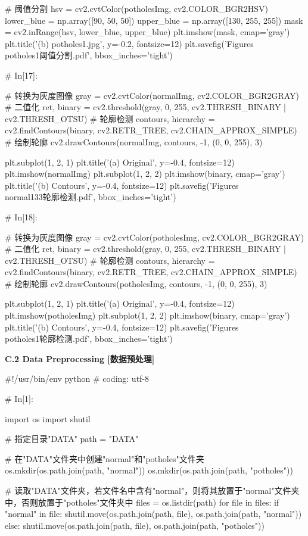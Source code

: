 \documentclass{MathorCupmodeling}
\begin{document}
\begin{python}
# 阈值分割
hsv = cv2.cvtColor(potholesImg, cv2.COLOR_BGR2HSV)
lower_blue = np.array([90, 50, 50])
upper_blue = np.array([130, 255, 255])
mask = cv2.inRange(hsv, lower_blue, upper_blue)
plt.imshow(mask, cmap='gray')
plt.title('(b) potholes1.jpg', y=-0.2, fontsize=12)
plt.savefig('Figures\\potholes1阈值分割.pdf', bbox_inches='tight')

# In[17]:


# 转换为灰度图像
gray = cv2.cvtColor(normalImg, cv2.COLOR_BGR2GRAY)
# 二值化
ret, binary = cv2.threshold(gray, 0, 255, cv2.THRESH_BINARY | cv2.THRESH_OTSU)
# 轮廓检测
contours, hierarchy = cv2.findContours(binary, cv2.RETR_TREE, cv2.CHAIN_APPROX_SIMPLE)
# 绘制轮廓
cv2.drawContours(normalImg, contours, -1, (0, 0, 255), 3)

plt.subplot(1, 2, 1)
plt.title('(a) Original', y=-0.4, fontsize=12)
plt.imshow(normalImg)
plt.subplot(1, 2, 2)
plt.imshow(binary, cmap='gray')
plt.title('(b) Contours', y=-0.4, fontsize=12)
plt.savefig('Figures\\normal133轮廓检测.pdf', bbox_inches='tight')

# In[18]:


# 转换为灰度图像
gray = cv2.cvtColor(potholesImg, cv2.COLOR_BGR2GRAY)
# 二值化
ret, binary = cv2.threshold(gray, 0, 255, cv2.THRESH_BINARY | cv2.THRESH_OTSU)
# 轮廓检测
contours, hierarchy = cv2.findContours(binary, cv2.RETR_TREE, cv2.CHAIN_APPROX_SIMPLE)
# 绘制轮廓
cv2.drawContours(potholesImg, contours, -1, (0, 0, 255), 3)

plt.subplot(1, 2, 1)
plt.title('(a) Original', y=-0.4, fontsize=12)
plt.imshow(potholesImg)
plt.subplot(1, 2, 2)
plt.imshow(binary, cmap='gray')
plt.title('(b) Contours', y=-0.4, fontsize=12)
plt.savefig('Figures\\potholes1轮廓检测.pdf', bbox_inches='tight')
\end{python}

\textbf{C.2 Data Preprocessing [数据预处理]}
\begin{python}
#!/usr/bin/env python
# coding: utf-8

# In[1]:


import os
import shutil

# 指定目录"DATA"
path = "DATA"

# 在"DATA"文件夹中创建"normal"和"potholes"文件夹
os.mkdir(os.path.join(path, "normal"))
os.mkdir(os.path.join(path, "potholes"))

# 读取"DATA"文件夹，若文件名中含有"normal"，则将其放置于"normal"文件夹中，否则放置于"potholes"文件夹中
files = os.listdir(path)
for file in files:
    if "normal" in file:
        shutil.move(os.path.join(path, file), os.path.join(path, "normal"))
    else:
        shutil.move(os.path.join(path, file), os.path.join(path, "potholes"))

\end{python}
\end{document}
